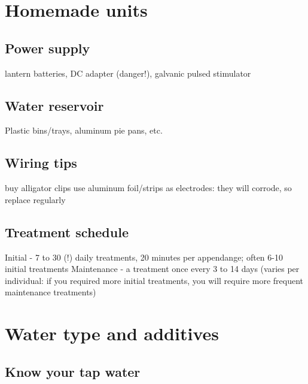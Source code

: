 \documentclass[]{book}
\begin{document}
\hypertarget{homemade-units}{%
\section{Homemade units}\label{homemade-units}}

\hypertarget{power-supply}{%
\subsection{Power supply}\label{power-supply}}

lantern batteries, DC adapter (danger!), galvanic pulsed stimulator

\hypertarget{water-reservoir}{%
\subsection{Water reservoir}\label{water-reservoir}}

Plastic bins/trays, aluminum pie pans, etc.

\hypertarget{wiring-tips}{%
\subsection{Wiring tips}\label{wiring-tips}}

buy alligator clips
use aluminum foil/strips as electrodes: they will corrode, so replace regularly

\hypertarget{treatment-schedule}{%
\subsection{Treatment schedule}\label{treatment-schedule}}

Initial - 7 to 30 (!) daily treatments, 20 minutes per appendange; often 6-10 initial treatments
Maintenance - a treatment once every 3 to 14 days (varies per individual: if you required more initial treatments, you will require more frequent maintenance treatments)

\hypertarget{water-type-and-additives}{%
\section{Water type and additives}\label{water-type-and-additives}}

\hypertarget{know-your-tap-water}{%
\subsection{Know your tap water}\label{know-your-tap-water}}
\end{document}
